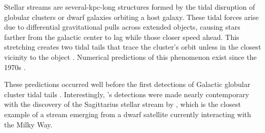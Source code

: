\documentclass{aa}
\begin{document}

  Stellar streams are several-kpc-long structures formed by the tidal disruption of globular clusters or dwarf galaxies orbiting a host galaxy. These tidal forces arise due to differential gravitational pulls across extended objects, causing stars farther from the galactic center to lag while those closer speed ahead. This stretching creates two tidal tails that trace the cluster's orbit unless in the closest vicinity to the object \citep{2007ApJ...659.1212M}. Numerical predictions of this phenomenon exist since the 1970s \citep[see, for example][]{1975AJ.....80..290K}. 
  
  These predictions occurred well before the first detections of Galactic globular cluster tidal tails \citep{1995AJ....109.2553G}. Interestingly, \citet{1995AJ....109.2553G}'s detections were made nearly contemporary with the discovery of the Sagittarius stellar stream by \citet{1994Natur.370..194I}, which is the closest example of a stream emerging from a dwarf satellite currently interacting with the Milky Way. 
  
\end{document}
